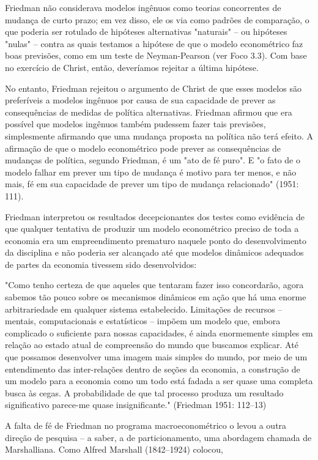\documentclass[12pt]{article}
\begin{document}
Friedman não considerava modelos ingênuos como teorias concorrentes de mudança de curto prazo; em vez disso, ele os via como padrões de comparação, o que poderia ser rotulado de hipóteses alternativas "naturais" – ou hipóteses "nulas" – contra as quais testamos a hipótese de que o modelo econométrico faz boas previsões, como em um teste de Neyman-Pearson (ver Foco 3.3). Com base no exercício de Christ, então, deveríamos rejeitar a última hipótese.

No entanto, Friedman rejeitou o argumento de Christ de que esses modelos são preferíveis a modelos ingênuos por causa de sua capacidade de prever as consequências de medidas de política alternativas. Friedman afirmou que era possível que modelos ingênuos também pudessem fazer tais previsões, simplesmente afirmando que uma mudança proposta na política não terá efeito. A afirmação de que o modelo econométrico pode prever as consequências de mudanças de política, segundo Friedman, é um "ato de fé puro". E "o fato de o modelo falhar em prever um tipo de mudança é motivo para ter menos, e não mais, fé em sua capacidade de prever um tipo de mudança relacionado" (1951: 111).

Friedman interpretou os resultados decepcionantes dos testes como evidência de que qualquer tentativa de produzir um modelo econométrico preciso de toda a economia era um empreendimento prematuro naquele ponto do desenvolvimento da disciplina e não poderia ser alcançado até que modelos dinâmicos adequados de partes da economia tivessem sido desenvolvidos:

"Como tenho certeza de que aqueles que tentaram fazer isso concordarão, agora sabemos tão pouco sobre os mecanismos dinâmicos em ação que há uma enorme arbitrariedade em qualquer sistema estabelecido. Limitações de recursos – mentais, computacionais e estatísticos – impõem um modelo que, embora complicado o suficiente para nossas capacidades, é ainda enormemente simples em relação ao estado atual de compreensão do mundo que buscamos explicar. Até que possamos desenvolver uma imagem mais simples do mundo, por meio de um entendimento das inter-relações dentro de seções da economia, a construção de um modelo para a economia como um todo está fadada a ser quase uma completa busca às cegas. A probabilidade de que tal processo produza um resultado significativo parece-me quase insignificante."
(Friedman 1951: 112–13)

A falta de fé de Friedman no programa macroeconométrico o levou a outra direção de pesquisa – a saber, a de particionamento, uma abordagem chamada de Marshalliana. Como Alfred Marshall (1842–1924) colocou,
\end{document}

